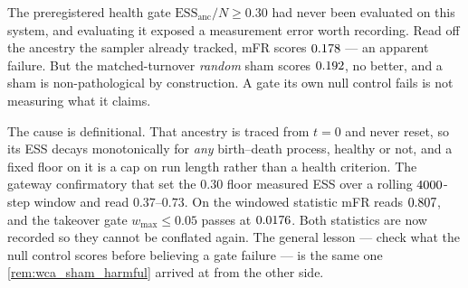 \begin{remark}
\label{rem:ess_window}
The preregistered health gate $\mathrm{ESS}_{\mathrm{anc}}/N\ge0.30$ had never been evaluated
on this system, and evaluating it exposed a measurement error worth recording. Read off the
ancestry the sampler already tracked, mFR scores $0.178$ --- an apparent failure.
But the matched-turnover \emph{random} sham scores $0.192$, no better, and a
sham is non-pathological by construction. A gate its own null control fails is not measuring
what it claims.

The cause is definitional. That ancestry is traced from $t=0$ and never reset, so its ESS
decays monotonically for \emph{any} birth--death process, healthy or not, and a fixed floor on
it is a cap on run length rather than a health criterion. The gateway confirmatory that set
the $0.30$ floor measured ESS over a rolling $4000$-step window and read
$0.37$--$0.73$. On the windowed statistic mFR reads $0.807$, and the takeover gate
$w_{\max}\le0.05$ passes at $0.0176$. Both statistics are now recorded so they cannot be
conflated again. The general lesson --- check what the null control scores before believing a
gate failure --- is the same one \cref{rem:wca_sham_harmful} arrived at from the other side.
\end{remark}

